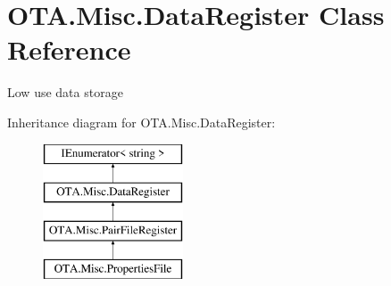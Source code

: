 \hypertarget{class_o_t_a_1_1_misc_1_1_data_register}{}\section{O\+T\+A.\+Misc.\+Data\+Register Class Reference}
\label{class_o_t_a_1_1_misc_1_1_data_register}


Low use data storage  


Inheritance diagram for O\+T\+A.\+Misc.\+Data\+Register\+:\begin{figure}[H]
\begin{center}
\leavevmode
\includegraphics[height=4.000000cm]{class_o_t_a_1_1_misc_1_1_data_register}
\end{center}
\end{figure}
